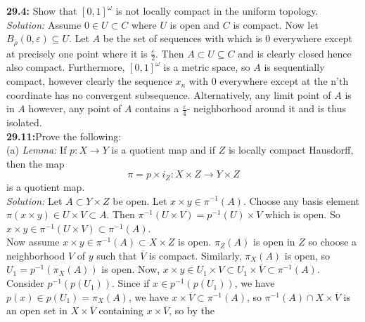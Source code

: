\documentclass[a4paper]{article}
\begin{document}
        \textbf{29.4:} Show that $\left[ 0,1 \right]^{\omega}$ is not locally
        compact in the uniform topology.\\
        \linebreak
        \textit{Solution:} Assume $0 \in U \subset C$ where
        $U$ is open and $C$ is compact. Now let
        $B_{\overline{\rho}} (0, \varepsilon) \subseteq U$.
        Let $A$ be the set of sequences with which is  $0$ everywhere except at
        precisely one point where it is $\frac{\varepsilon}{2}$. Then
        $A \subset U \subseteq C$ and is clearly closed hence also compact.
        Furthermore, $\left[ 0,1 \right]^{\omega}$ is a metric space, so
        $A$ is sequentially compact, however clearly the sequence $x_n$ with
        $0$ everywhere except at the  n'th coordinate has no convergent
        subsequence. Alternatively, any limit point of $A$ is in $A$ however,
        any point of $A$ contains a $\frac{\varepsilon}{4}$- neighborhood
        around it and is thus isolated.\\
        \linebreak
        \textbf{29.11:}Prove the following:\\
        (a) \textit{Lemma:} If $p  \colon X \to Y$ is a quotient map and if $Z$ 
        is locally compact Hausdorff, then the map
        \[
        \pi = p \times i_Z  \colon X \times Z \to Y \times Z
        \] 
        is a quotient map.\\
        \linebreak
        \textit{Solution:} Let $A \subset Y \times Z$  be open.
        Let $x \times y \in \pi^{-1}(A)$. Choose any basis element
        $\pi (x \times y) \in U \times V \subset A$. Then $\pi^{-1}(U \times V) = p^{-1}(U) \times
        V$ which is open. So $x \times y \in \pi^{-1}\left( U \times V \right) 
        \subset \pi^{-1}(A)$.\\
        Now assume $x \times y \in \pi^{-1}(A) \subset X \times Z$ is open. 
        $\pi_Z (A)$ is open in $Z$ so choose a neighborhood $V$ of
        $y$ such that $\overline{V}$ is compact. Similarly,
        $\pi_X (A)$ is open, so $U_1 = p^{-1}\left( \pi_X (A) \right) $ is open.
        Now, $x \times y \in U_1 \times V \subset U_1 \times \overline{V}
        \subset \pi^{-1}(A)$. Consider $p^{-1}\left( p(U_1) \right) $.
        Since if $x \in p^{-1}(p(U_1))$, we have
        $p(x) \in p(U_1) = \pi_X (A)$, we have
        $x \times \overline{V} \subset \pi^{-1}(A)$, so 
        $\pi^{-1}(A) \cap X \times \overline{V}$ is an open set in
        $X \times \overline{V}$ containing $x \times \overline{V}$, so by the
\end{document}
